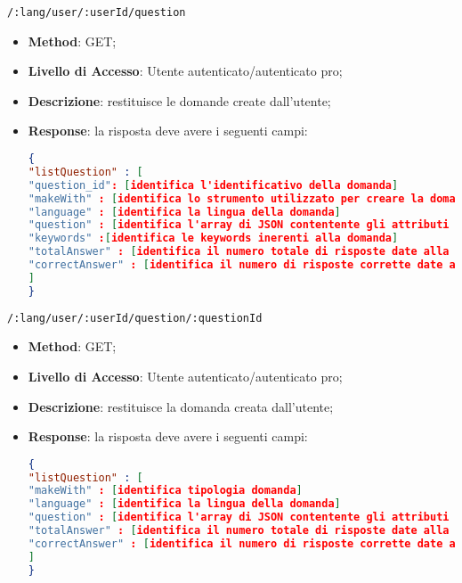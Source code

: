 \item \texttt{/:lang/user/:userId/question}
	\begin{itemize}
		\item \textbf{Method}: GET;
		\item \textbf{Livello di Accesso}: Utente autenticato/autenticato pro;
		\item \textbf{Descrizione}: restituisce le domande create dall'utente;
		\item \textbf{Response}: la risposta deve avere i seguenti campi:
\begin{lstlisting}[language=json,firstnumber=1]
{
"listQuestion" : [ 
"question_id": [identifica l'identificativo della domanda]
"makeWith" : [identifica lo strumento utilizzato per creare la domanda]
"language" : [identifica la lingua della domanda]
"question" : [identifica l'array di JSON contentente gli attributi che formano una domanda]
"keywords" :[identifica le keywords inerenti alla domanda]
"totalAnswer" : [identifica il numero totale di risposte date alla domanda]
"correctAnswer" : [identifica il numero di risposte corrette date alla domanda]
]
}
\end{lstlisting}
	\end{itemize}	

\item \texttt{/:lang/user/:userId/question/:questionId}
	\begin{itemize}
		\item \textbf{Method}: GET;
		\item \textbf{Livello di Accesso}: Utente autenticato/autenticato pro;
		\item \textbf{Descrizione}: restituisce la domanda creata dall'utente;
		\item \textbf{Response}: la risposta deve avere i seguenti campi:
\begin{lstlisting}[language=json,firstnumber=1]
{
"listQuestion" : [ 
"makeWith" : [identifica tipologia domanda]
"language" : [identifica la lingua della domanda]
"question" : [identifica l'array di JSON contentente gli attributi che formano una domanda]
"totalAnswer" : [identifica il numero totale di risposte date alla domanda]
"correctAnswer" : [identifica il numero di risposte corrette date alla domanda]
]
}
\end{lstlisting}
	\end{itemize}	
	
